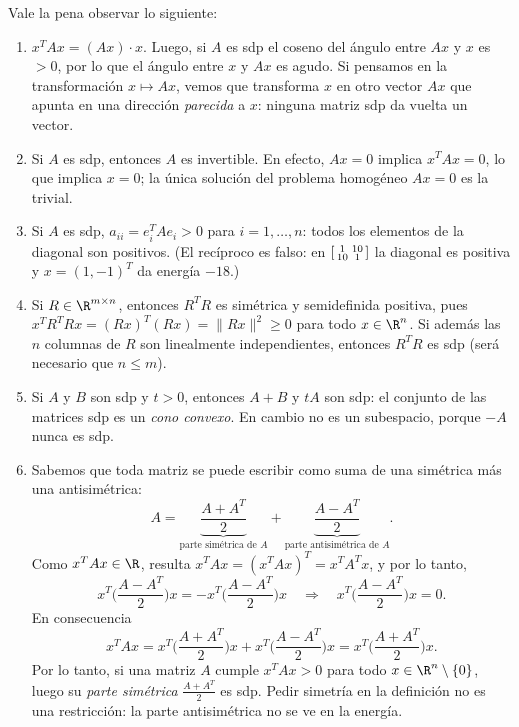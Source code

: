 \begin{remark}\label{obs:sdp-basicas} Vale la pena observar lo siguiente:
  \begin{enumerate}[label=\textbf{(\arabic*)}]
  \item
    $x^T A x = (Ax)\cdot x$. Luego, si $A$ es sdp el coseno del ángulo entre
    $Ax$ y $x$ es $>0$, por lo que el ángulo entre $x$ y $Ax$ es agudo. Si
    pensamos en la transformación $x \mapsto Ax$, vemos que transforma $x$ en
    otro vector $Ax$ que apunta en una dirección \emph{parecida} a $x$: ninguna
    matriz sdp da vuelta un vector.
  \item
    Si $A$ es sdp, entonces $A$ es invertible. En efecto, $Ax = 0$ implica
    $x^TAx=0$, lo que implica $x=0$; la única solución del problema homogéneo
    $Ax=0$ es la trivial.
  \item
    Si $A$ es sdp, $a_{ii} = e_i^T A e_i > 0$ para $i=1,\dots,n$: todos los
    elementos de la diagonal son positivos. (El recíproco es falso: en
    $\begin{bsmallmatrix} 1 & 10\\ 10 & 1\end{bsmallmatrix}$ la diagonal es
    positiva y $x=(1,-1)^T$ da energía $-18$.)
  \item
    Si $R \in \R^{m\times n}$, entonces $R^T R$ es simétrica y semidefinida
    positiva, pues $x^T R^T R x = (Rx)^T (Rx) = \|Rx\|^2 \ge 0$ para todo
    $x \in \R^n$. Si además las $n$ columnas de $R$ son linealmente
    independientes, entonces $R^T R$ es sdp (será necesario que $n \le m$).
  \item
    Si $A$ y $B$ son sdp y $t>0$, entonces $A+B$ y $tA$ son sdp: el conjunto
    de las matrices sdp es un \emph{cono convexo}. En cambio no es un
    subespacio, porque $-A$ nunca es sdp.
  \item
    Sabemos que toda matriz se puede escribir como suma de una simétrica más
    una antisimétrica:
    \[
    A = \underbrace{ \frac{A+A^T}2 }_{\text{parte simétrica de $A$}}
    + \underbrace{ \frac{A-A^T}2 }_{\text{parte antisimétrica de $A$}}.
    \]
    Como $x^T A x \in \R$, resulta $x^T A x = (x^T A x)^T = x^T A^T x$, y por
    lo tanto,
    \[ x^T \Big(\frac{A-A^T}2\Big) x = - x^T \Big(\frac{A-A^T}2\Big) x
    \quad \Longrightarrow \quad x^T \Big(\frac{A-A^T}2\Big) x = 0.
    \]
    En consecuencia
    \[
    x^T A x = x^T \Big(\frac{A+A^T}2\Big) x + x^T \Big(\frac{A-A^T}2\Big) x
    = x^T \Big(\frac{A+A^T}2\Big) x.
    \]
    Por lo tanto, si una matriz $A$ cumple $x^T A x > 0$ para todo
    $x \in \R^n\setminus\{0\}$, luego su \emph{parte simétrica}
    $\frac{A+A^T}2$ es sdp. Pedir simetría en la definición no es una
    restricción: la parte antisimétrica no se ve en la energía.
  \end{enumerate}
\end{remark}

